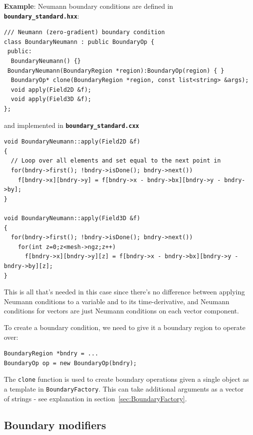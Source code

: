 \documentclass[12pt]{article}
\newcommand{\code}[1]{\texttt{#1}}
\newcommand{\file}[1]{\texttt{\bf #1}}
\begin{document}
{\bf Example}: Neumann boundary conditions are defined in
\file{boundary\_standard.hxx}:
\begin{lstlisting}[firstnumber=22]
/// Neumann (zero-gradient) boundary condition
class BoundaryNeumann : public BoundaryOp {
 public:
  BoundaryNeumann() {}
 BoundaryNeumann(BoundaryRegion *region):BoundaryOp(region) { }
  BoundaryOp* clone(BoundaryRegion *region, const list<string> &args);
  void apply(Field2D &f);
  void apply(Field3D &f);
};
\end{lstlisting}
and implemented in \file{boundary\_standard.cxx} 
\begin{lstlisting}[firstnumber=52]
void BoundaryNeumann::apply(Field2D &f)
{
  // Loop over all elements and set equal to the next point in
  for(bndry->first(); !bndry->isDone(); bndry->next())
    f[bndry->x][bndry->y] = f[bndry->x - bndry->bx][bndry->y - bndry->by];
}

void BoundaryNeumann::apply(Field3D &f)
{
  for(bndry->first(); !bndry->isDone(); bndry->next())
    for(int z=0;z<mesh->ngz;z++)
      f[bndry->x][bndry->y][z] = f[bndry->x - bndry->bx][bndry->y - bndry->by][z];
}
\end{lstlisting}
This is all that's needed in this case since there's no difference between
applying Neumann conditions to a variable and to its time-derivative, 
and Neumann conditions for vectors are just Neumann conditions
on each vector component. 

To create a boundary condition, we need to give it a boundary region
to operate over:
\begin{lstlisting}[numbers=none]
BoundaryRegion *bndry = ...
BoundaryOp op = new BoundaryOp(bndry);
\end{lstlisting}

The \code{clone} function is used to create
boundary operations given a single object as a template
in \code{BoundaryFactory}. This can take additional arguments
as a vector of strings - see explanation in section~\ref{sec:BoundaryFactory}.

\subsection{Boundary modifiers}
\end{document}
